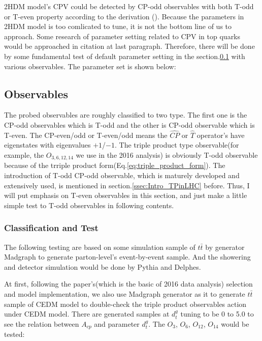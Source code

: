 			2HDM model's CPV could be detected by CP-odd observables with both T-odd or T-even property according to the derivation (\cite{Bernreuther:1993hq}). Because the parameters in 2HDM model is too comlicated to tune, it is not the bottom line of us to approach. Some research of parameter setting related to CPV in top quarks would be approached in citation at last paragraph. Therefore, there will be done by some fundamental test of default parameter setting in the section.\ref{ssec:AcpObs} with various observables. The parameter set is shown below:

	\subsection{Observables}
	\label{ssec:AcpObs}

		The probed observables are roughly classified to two type. The first one is the CP-odd observables which is T-odd and the other is CP-odd observable which is T-even. The CP-even/odd or T-even/odd means the $\hat{CP}$ or $\hat{T}$ operator's have eigenstates with eigenvalues $+1$/$-1$. The triple product type observable(for example, the $O_{3,6,12,14}$ we use in the 2016 analysis) is obviously T-odd observable because of the trriple product form(Eq.\ref{eq:triple_product_form}). The introduction of T-odd CP-odd observable, which is maturely developed and extensively used, is mentioned in section.\ref{ssec:Intro_TPinLHC} before. Thus, I will put emphasis on T-even observables in this section, and just make a little simple test to T-odd observables in following contents.

		\subsubsection{Classification and Test}
		\label{sssec:AcpObs_class_test}

			The following testing are based on some simulation sample of $t\bar{t}$ by generator Madgraph to generate parton-level's event-by-event sample. And the showering and detector simulation would be done by Pythia\cite{Sjostrand:2014zea} and Delphes\cite{Ovyn:2009tx}.

			At first, following the paper\cite{Hayreter:2015ryk}'s(which is the basic of 2016 data analysis) selection and model implementation, we also use Madgraph\cite{Alwall:2011uj} generator as it to generate $t\bar{t}$ sample of CEDM model to double-check the triple product observables action under CEDM model. There are generated samples at $d_t^g$ tuning to be 0 to 5.0 to see the relation between $A_{cp}$ and parameter $d_t^g$. The $O_{3}$, $O_{6}$, $O_{12}$, $O_{14}$ would be tested:

